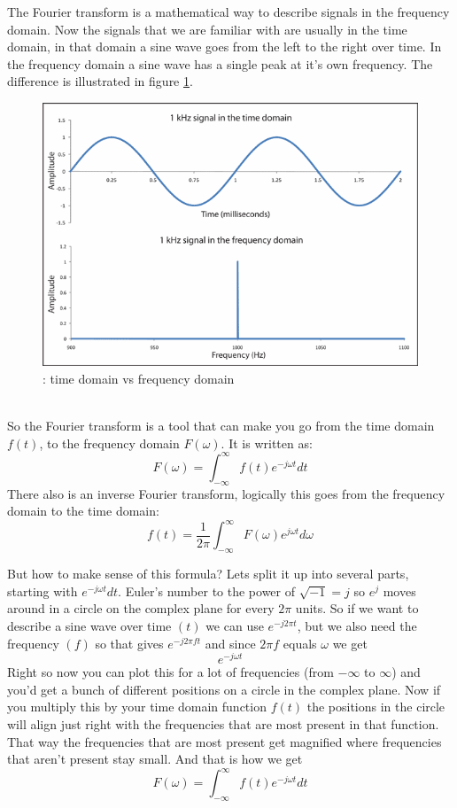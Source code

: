 \documentclass[11pt, A4, oneside]{article}
\begin{document}
The Fourier transform is a mathematical way to describe signals in the frequency domain. Now the signals that we are familiar with are usually in the time domain, in that domain a sine wave goes from the left to the right over time. In the frequency domain a sine wave has a single peak at it's own frequency. The difference is illustrated in figure \ref{time_vs_freq}.\\
\begin{figure}[!ht]
	\centering
	\includegraphics[width=\linewidth]{time_and_frequency_domain}
	\caption{: time domain vs frequency domain}
	\label{time_vs_freq}
\end{figure}
\\
So the Fourier transform is a tool that can make you go from the time domain \(f(t)\), to the frequency domain \(F(\omega)\). It is written as: \[F(\omega) = \int_{-\infty}^{\infty} f(t)e^{-j\omega t} dt \] There also is an inverse Fourier transform, logically this goes from the frequency domain to the time domain:\[f(t) = \frac{1}{2\pi} \int_{-\infty}^{\infty} F(\omega)e^{j\omega t} d\omega \] 

\newpage
But how to make sense of this formula? Lets split it up into several parts, starting with \(e^{-j\omega t} dt\). Euler's number to the power of  \(\sqrt{-1} = j\)  so \(e^j\) moves around in a circle on the complex plane for every \(2\pi\) units. So if we want to describe a sine wave over time \((t)\) we can use \(e^{-j2\pi t}\), but we also need the frequency \((f)\) so that gives \(e^{-j2\pi f t}\) and since \(2 \pi f\) equals \(\omega\) we get \[e^{-j\omega t} \] Right so now you can plot this for a lot of frequencies (from \(-\infty\) to \(\infty\)) and you'd get a bunch of different positions on a circle in the complex plane. Now if you multiply this by your time domain function \(f(t)\) the positions in the circle will align just right with the frequencies that are most present in that function. That way the frequencies that are most present get magnified where frequencies that aren't present stay small. And that is how we get \[F(\omega) = \int_{-\infty}^{\infty} f(t)e^{-j\omega t} dt \]  
\end{document}
